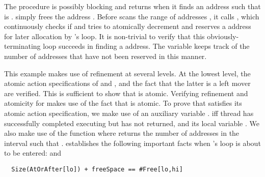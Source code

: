 The  procedure is possibly blocking and returns when it
finds an address  such that  is
.  simply frees the address
. 
Before  scans the range of addresses
\exC{[lo,hi]}, it calls , which continuously checks if
 and tries to atomically decrement 
and reserves a  address for later allocation by
's  loop. It is non-trivial to verify that this
obviously-terminating  loop succeeds in finding a
 address. The variable  keeps track of the
number of  addresses that have not been reserved in this
manner. 

This example makes use of refinement at several levels. At the lowest
level, the atomic action specifications of  and
, and the fact that the latter is a left mover
are verified. This is sufficient to show that  is
atomic. Verifying refinement and atomicity for  makes use
of the fact that  is atomic. To prove that 
satisfies its atomic action specification, we make use of an auxiliary
variable .  iff thread
 has successfully completed executing  but has
not returned, and its local variable . We also make use
of the function  where  returns the number
of addresses  in the interval \exC{[u,v]} such that
. 
establishes the following important facts when 's
 loop is about to be entered:  and 
\begin{verbatim}
  Size(AtOrAfter[lo]) + freeSpace == #Free[lo,hi] 
\end{verbatim}


%
%
%
%
%


